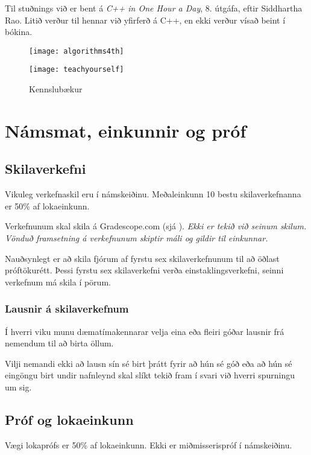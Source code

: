 \documentclass{article}
\begin{document}
Til stuðnings við er bent á \emph{C++ in One Hour a Day}, 8. útgáfa, eftir Siddhartha Rao. Litið verður til hennar við yfirferð á C++, en ekki verður vísað beint í bókina.

\begin{figure}
	\caption{Kennslubækur}
	\begin{multicols}{2}
		\begin{center}
			\texttt{[image: algorithms4th]}
		\end{center}

		\begin{center}
			\texttt{[image: teachyourself]}
		\end{center}
	\end{multicols}
\end{figure}

\newpage
\section{Námsmat, einkunnir og próf}
\subsection{Skilaverkefni}
Vikuleg verkefnaskil eru í námskeiðinu. Meðaleinkunn 10 bestu skilaverkefnanna er 50\% af lokaeinkunn.

Verkefnunum skal skila á Gradescope.com (sjá ). \emph{Ekki er tekið við seinum skilum. Vönduð framsetning á verkefnunum skiptir máli og gildir til einkunnar.}

Nauðsynlegt er að skila fjórum af fyrstu sex skilaverkefnunum til að öðlast próftökurétt. Þessi fyrstu sex skilaverkefni verða einstaklingsverkefni, seinni verkefnum má skila í pörum.

\subsubsection{Lausnir á skilaverkefnum}

Í hverri viku munu dæmatímakennarar velja eina eða fleiri góðar lausnir frá nemendum til að birta öllum.

Vilji nemandi ekki að lausn sín sé birt þrátt fyrir að hún sé góð eða að hún sé eingöngu birt undir nafnleynd skal slíkt tekið fram í svari við hverri spurningu um sig.

\subsection{Próf og lokaeinkunn}
Vægi lokaprófs er 50\% af lokaeinkunn. Ekki er miðmisserispróf í námskeiðinu.
\end{document}
